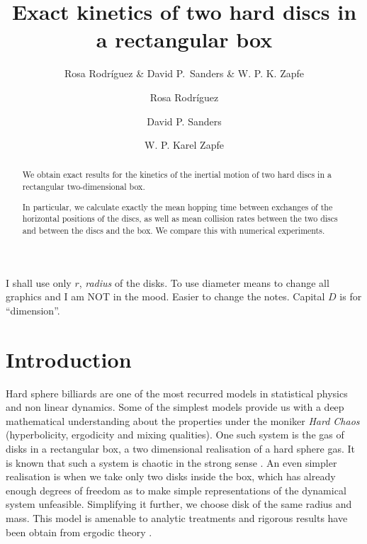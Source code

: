 \documentclass[a4paper,10pt, jcp, aps, preprint]{revtex4-1}
\author{Rosa Rodríguez \& David P.~Sanders \& W. P. K. Zapfe}
\affil{Departamento de Física, Facultad de Ciencias, Universidad Nacional Autónoma de México, Ciudad Universitaria, Del.~Coyoacán, México D.F. 04510, Mexico}
\begin{document}
\title{Exact kinetics of two hard discs in a rectangular box}

\author{Rosa Rodríguez}

\author{David P. Sanders}

\author{W. P. Karel Zapfe}


\begin{abstract}
  We obtain exact results for the kinetics of the inertial motion of 
two hard discs in a rectangular two-dimensional box.

  In particular,  we calculate exactly the mean hopping time between exchanges
 of the horizontal positions of the discs, 
as well as mean collision rates between the two discs and 
 between the discs and the box. We compare this with numerical experiments.
\end{abstract}

\maketitle

I shall use only $r$, \emph{radius} of the disks. To use diameter
means to change all graphics and I am NOT in the mood. Easier to change the notes.
Capital $D$ is for ``dimension''.

\section{Introduction}

Hard sphere billiards are one of the most recurred models in
statistical physics and non linear dynamics.  Some of the simplest models
 provide us with a deep mathematical understanding
about  the properties under the moniker \emph{Hard Chaos} 
(hyperbolicity, ergodicity and mixing qualities). One such system is the
gas of disks in a rectangular box, a two dimensional realisation of a
hard sphere gas. It is known that such a system is chaotic in the
strong sense \cite{Sinai70}. An even simpler realisation
is when we take only two disks inside the box, which 
has already enough degrees of freedom as to make simple representations
of the dynamical system unfeasible. Simplifying it further,
we choose disk of the same radius and mass. This model is amenable
to analytic treatments
and rigorous results have been obtain from ergodic theory
\cite{Sinai70, Gallavotti74, SzaszBook00}. 
\end{document}
